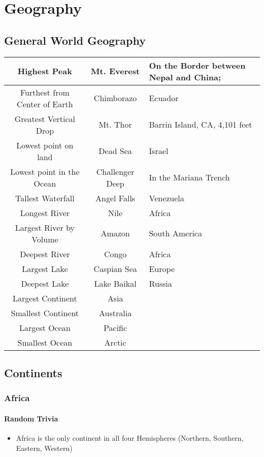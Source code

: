 \chapter{Geography}
	\section{General World Geography}
		\begin{longtable}{|c|c|p{3in}|}
			\hline
			Highest Peak & Mt. Everest & On the Border between Nepal and China;  \\
			\hline
			Furthest from Center of Earth & Chimborazo & Ecuador \\
			\hline
			Greatest Vertical Drop & Mt. Thor & Barrin Island, CA, 4,101 feet \\
			\hline
			Lowest point on land & Dead Sea& Israel \\
			\hline
			Lowest point in the Ocean & Challenger Deep & In the Mariana Trench \\
			\hline
			Tallest Waterfall & Angel Falls & Venezuela \\
			\hline
			Longest River & Nile & Africa \\
			\hline
			Largest River by Volume & Amazon & South America \\
			\hline
			Deepest River & Congo & Africa \\
			\hline
			Largest Lake & Caspian Sea & Europe \\
			\hline
			Deepest Lake & Lake Baikal & Russia \\
			\hline
			Largest Continent & Asia & \\
			\hline
			Smallest Continent & Australia & \\ 
			\hline
			Largest Ocean & Pacific & \\
			\hline
			Smallest Ocean & Arctic & \\
			\hline
			
			
			
		\end{longtable}
	
	
	\section{Continents}
	\subsection{Africa}
		\subsubsection{Random Trivia}
		\begin{itemize} 
			\item Africa is the only continent in all four Hemispheres (Northern, Southern, Eastern, Western)
		\end{itemize}
